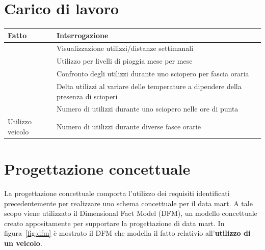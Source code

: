 \section{Carico di lavoro}
\begin{table}[h]
\centering
\begin{tabular}{|l|l|}
\hline
\rowcolor[HTML]{3166FF} 
{\color[HTML]{FFFFFF} \textbf{Fatto}} & {\color[HTML]{FFFFFF} \textbf{Interrogazione}}                                  \\ \hline
                                      & Visualizzazione utilizzi/distanze settimanali                     \\ \cline{2-2} 
                                      & Utilizzo per livelli di pioggia mese per mese                              \\ \cline{2-2} 
                                      & Confronto degli utilizzi durante uno sciopero per fascia oraria                      \\ \cline{2-2}  
                                      & Delta utilizzi al variare delle temperature a dipendere della presenza di scioperi \\ \cline{2-2} 
                                      & Numero di utilizzi durante uno sciopero nelle ore di punta         \\ \cline{2-2} 
\multirow{-7}{*}{Utilizzo veicolo}    & Numero di utilizzi durante diverse fasce orarie      \\ \hline
\end{tabular}
\end{table}
\section{Progettazione concettuale}
La progettazione concettuale comporta l’utilizzo dei requisiti identificati precedentemente 
per realizzare uno schema concettuale per il data mart. A tale scopo viene utilizzato il
Dimensional Fact Model (DFM), un modello concettuale creato appositamente per supportare
la progettazione di data mart. 
In figura~\ref{fig:dfm} è mostrato il DFM che modella il fatto relativio
all'\textbf{utilizzo di un veicolo}.

